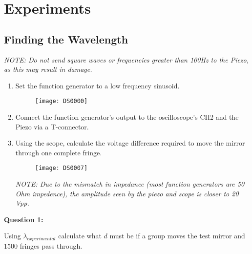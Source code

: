 
\section{Experiments}
	\subsection{Finding the Wavelength}

\emph{NOTE: Do not send square waves or frequencies greater than 100Hz
to the Piezo, as this may result in damage.}

\begin{enumerate}
 	\item Set the function generator to a low frequency sinusoid.
		\begin{figure}[ht!]
		\centering
		\texttt{[image: DS0000]}
		\end{figure}
	\item Connect the function generator's output to the oscilloscope's CH2
        and the Piezo via a T-connector.
	\item Using the scope, calculate the voltage difference required
		  to move the mirror through one complete fringe.
		\begin{figure}[ht!]
		\centering
		\texttt{[image: DS0007]}
		\end{figure}

	\emph{NOTE: Due to the mismatch in impedance (most function generators
		are 50 Ohm impedence), the amplitude seen by the piezo and scope is closer to 20 Vpp.}

\end{enumerate}



\textbf{Question 1:}
	
	\indent Using $\lambda_{experimental}$ calculate what $d$ must be
	if a group moves the test mirror and 1500 fringes pass through.


